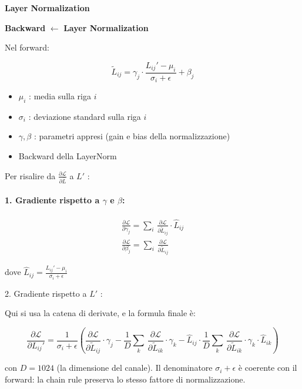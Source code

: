 \documentclass[
  11pt,
]{article}
\newcommand{\currentstep}[1]{%
\begin{tcolorbox}[colback=red!3, colframe=red!40!black, boxrule=0.3pt, arc=2pt,
  left=4pt, right=4pt, top=2pt, bottom=2pt]
{\footnotesize\textbf{Backward} $\longleftarrow$ \textbf{#1}}
\end{tcolorbox}}
\begin{document}
\textbf{Layer Normalization}

\currentstep{Layer Normalization}

Nel forward:

\[{\widetilde{L}}_{ij} = \gamma_{j} \cdot \frac{L_{ij}' - \mu_{i}}{\sigma_{i} + \epsilon} + \beta_{j}\]

\begin{itemize}
\item
  \(\mu_{i}\) : media sulla riga \(i\)
\item
  \(\sigma_{i}\) : deviazione standard sulla riga \(i\)
\item
  \(\gamma,\beta\) : parametri appresi (gain e bias della
  normalizzazione)
\item
  Backward della LayerNorm
\end{itemize}

Per risalire da \(\frac{\partial\mathcal{L}}{\partial\bar{L}}\) a \(L'\)
:

\paragraph{1. Gradiente rispetto a $\gamma$ e $\beta$:}

\[\begin{matrix}
\frac{\partial\mathcal{L}}{\partial\gamma_{j}} = \sum_{i}^{}\,\frac{\partial\mathcal{L}}{\partial{\widetilde{L}}_{ij}} \cdot {\widehat{L}}_{ij} \\
\frac{\partial\mathcal{L}}{\partial\beta_{j}} = \sum_{i}^{}\,\frac{\partial\mathcal{L}}{\partial{\widetilde{L}}_{ij}}
\end{matrix}\]

dove
\({\widehat{L}}_{ij} = \frac{L_{ij}' - \mu_{i}}{\sigma_{i} + \epsilon}\)

2. Gradiente rispetto a \(L'\) :

Qui si usa la catena di derivate, e la formula finale è:

\[\frac{\partial\mathcal{L}}{\partial L_{ij}'} = \frac{1}{\sigma_{i} + \epsilon}\left( \frac{\partial\mathcal{L}}{\partial{\widetilde{L}}_{ij}} \cdot \gamma_{j} - \frac{1}{D}\sum_{k}^{}\,\frac{\partial\mathcal{L}}{\partial{\widetilde{L}}_{ik}} \cdot \gamma_{k} - {\widehat{L}}_{ij} \cdot \frac{1}{D}\sum_{k}^{}\,\frac{\partial\mathcal{L}}{\partial{\widetilde{L}}_{ik}} \cdot \gamma_{k} \cdot {\widehat{L}}_{ik} \right)\]

con \(D = 1024\) (la dimensione del canale). Il denominatore $\sigma_i + \epsilon$ è coerente con il forward: la chain rule preserva lo stesso fattore di normalizzazione.
\end{document}
